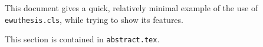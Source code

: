 This document gives a quick, relatively minimal example of the use of
\texttt{ewuthesis.cls}, while trying to show its features.

This section is contained in \texttt{abstract.tex}.
